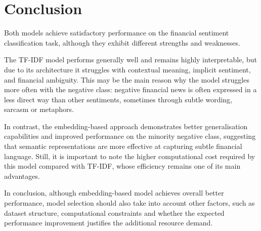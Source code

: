 \documentclass[11pt]{article}
\begin{document}
    \section{Conclusion}

    Both models achieve satisfactory performance on the financial sentiment classification task, although they exhibit different strengths and weaknesses.

    The TF-IDF model performs generally well and remains highly interpretable, but due to its architecture it struggles with contextual meaning, implicit sentiment, and financial ambiguity. This may be the main reason why the model struggles more often with the negative class: negative financial news is often expressed in a less direct way than other sentiments, sometimes through subtle wording, sarcasm or metaphors.

    In contrast, the embedding-based approach demonstrates better generalisation capabilities and improved performance on the minority negative class, suggesting that semantic representations are more effective at capturing subtle financial language. Still, it is important to note the higher computational cost required by this model compared with TF-IDF, whose efficiency remains one of its main advantages.

    In conclusion, although embedding-based model achieves overall better performance, model selection should also take into account other factors, such as dataset structure, computational constraints and whether the expected performance improvement justifies the additional resource demand.
\end{document}

